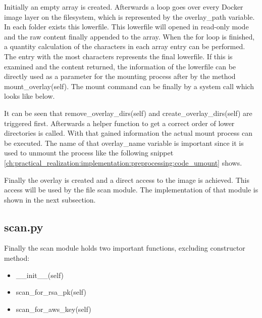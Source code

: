 
Initially an empty array is created. Afterwards a loop goes over every Docker image layer on the filesystem, which is represented by the overlay\_path variable.
In each folder exists this lowerfile. This lowerfile will opened in read-only mode and the raw content finally appended to the array. When the for loop is finished, a quantity calculation of the characters in each array entry can be performed. The entry with the most characters represents the final lowerfile.	
If this is examined and the content returned, the information of the lowerfile can be directly used as a parameter for the mounting process after by the method mount\_overlay(self).
The mount command can be finally by a system call which looks like below.

It can be seen that remove\_overlay\_dirs(self) and create\_overlay\_dirs(self) are triggered first. Afterwards a helper function to get a correct order of lower directories is called. With that gained information the actual mount process can be executed. The name of that overlay\_name variable is important since it is used to unmount the process like the following snippet \ref{ch:practical_realization:implementation:preprocessing:code_umount} shows.


Finally the overlay is created and a direct access to the image is achieved. This access will be used by the file scan module. The implementation of that module is shown in the next subsection.

\subsection{scan.py}
\label{ch:practical_realization:implementation:scan}
Finally the scan module holds two important functions, excluding constructor method:
\begin{itemize}
\item \_\_init\_\_(self)
\item scan\_for\_rsa\_pk(self)
\item scan\_for\_aws\_key(self)
\end{itemize}

